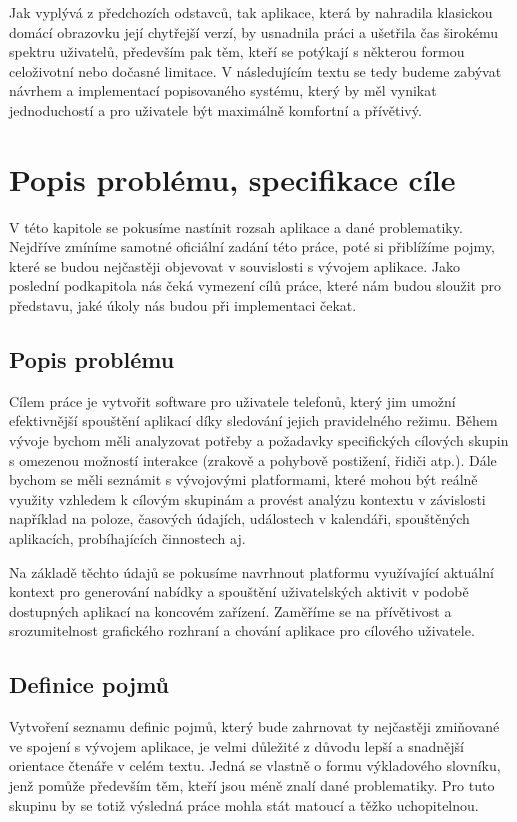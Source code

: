 \documentclass[thesis=M,czech]{FITthesis}[2012/06/26]
\begin{document}
\begin{introduction}
Jak vyplývá z předchozích odstavců, tak aplikace, která by nahradila klasickou domácí obrazovku její chytřejší verzí, by usnadnila práci a ušetřila čas širokému spektru uživatelů, především pak těm, kteří se potýkají s některou formou celoživotní nebo dočasné limitace. V následujícím textu se tedy budeme zabývat návrhem a implementací popisovaného systému, který by měl vynikat jednoduchostí a pro uživatele být maximálně komfortní a přívětivý.

\section{Popis problému, specifikace cíle}

V této kapitole se pokusíme nastínit rozsah aplikace a dané problematiky. Nejdříve zmíníme samotné oficiální zadání této práce, poté si přiblížíme pojmy, které se budou nejčastěji objevovat v souvislosti s vývojem aplikace. Jako poslední podkapitola nás čeká vymezení cílů práce, které nám budou sloužit pro představu, jaké úkoly nás budou při implementaci čekat.

\subsection{Popis problému}

Cílem práce je vytvořit software pro uživatele  telefonů, který jim umožní efektivnější spouštění aplikací díky sledování jejich pravidelného režimu. Během vývoje bychom měli analyzovat potřeby a požadavky specifických cílových skupin s omezenou možností interakce (zrakově a pohybově postižení, řidiči atp.). Dále bychom se měli seznámit s vývojovými platformami, které mohou být reálně využity vzhledem k cílovým skupinám a provést analýzu kontextu v závislosti například na poloze, časových údajích, událostech v kalendáři, spouštěných aplikacích, probíhajících činnostech aj.

Na základě těchto údajů se pokusíme navrhnout platformu využívající aktuální kontext pro generování nabídky a spouštění uživatelských aktivit v podobě dostupných aplikací na koncovém zařízení. Zaměříme se na přívětivost a srozumitelnost grafického rozhraní a chování aplikace pro cílového uživatele.

\subsection{Definice pojmů}

Vytvoření seznamu definic pojmů, který bude zahrnovat ty nejčastěji zmiňované ve spojení s vývojem aplikace, je velmi důležité z důvodu lepší a snadnější orientace čtenáře v celém textu. Jedná se vlastně o formu výkladového slovníku, jenž pomůže především těm, kteří jsou méně znalí dané problematiky. Pro tuto skupinu by se totiž výsledná práce mohla stát matoucí a těžko uchopitelnou.


\end{introduction}
\end{document}
